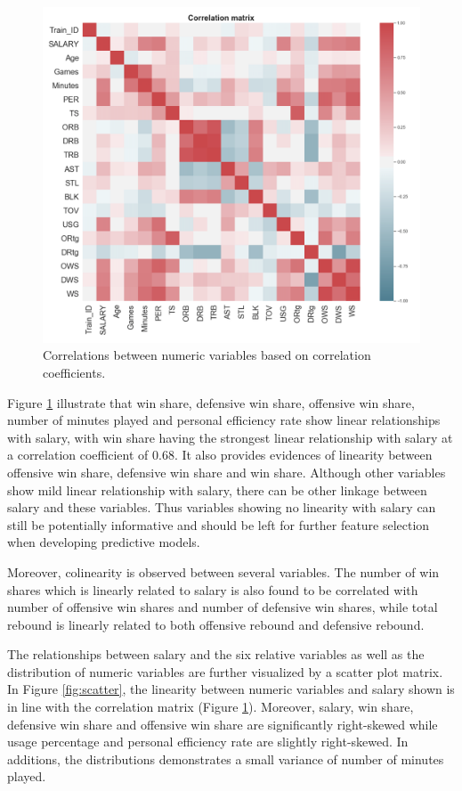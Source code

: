 \documentclass[letterpaper,12pt,twoside,]{pinp}
\begin{document}
\begin{figure}
\includegraphics[width=1\linewidth]{correlation.png}
\centering
\caption{Correlations between numeric variables based on correlation coefficients.}
\label{fig:correlation}
\end{figure}

Figure \ref{fig:correlation} illustrate that win share, defensive win
share, offensive win share, number of minutes played and personal
efficiency rate show linear relationships with salary, with win share
having the strongest linear relationship with salary at a correlation
coefficient of 0.68. It also provides evidences of linearity between
offensive win share, defensive win share and win share. Although other
variables show mild linear relationship with salary, there can be other
linkage between salary and these variables. Thus variables showing no
linearity with salary can still be potentially informative and should be
left for further feature selection when developing predictive models.

Moreover, colinearity is observed between several variables. The number
of win shares which is linearly related to salary is also found to be
correlated with number of offensive win shares and number of defensive
win shares, while total rebound is linearly related to both offensive
rebound and defensive rebound.

The relationships between salary and the six relative variables as well
as the distribution of numeric variables are further visualized by a
scatter plot matrix. In Figure \ref{fig:scatter}, the linearity between
numeric variables and salary shown is in line with the correlation
matrix (Figure \ref{fig:correlation}). Moreover, salary, win share,
defensive win share and offensive win share are significantly
right-skewed while usage percentage and personal efficiency rate are
slightly right-skewed. In additions, the distributions demonstrates a
small variance of number of minutes played.
\end{document}
